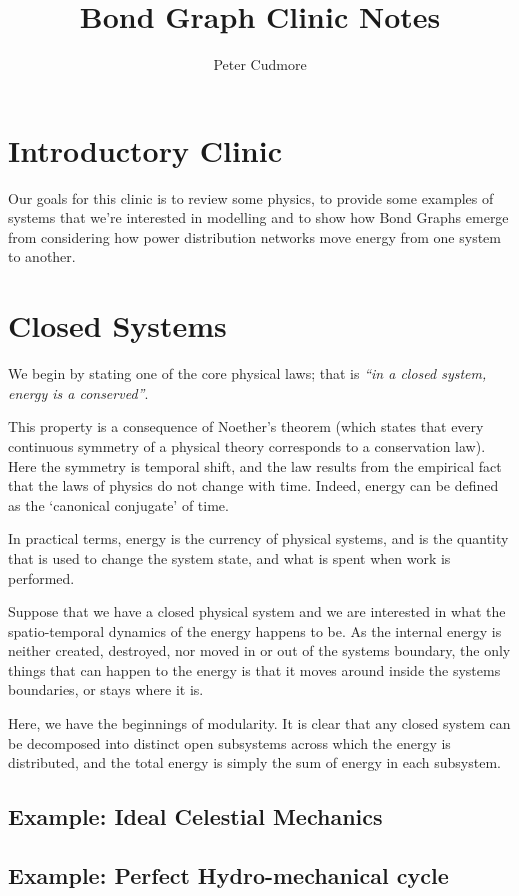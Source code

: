 \documentclass[11pt, a4paper]{amsart}
\title{Bond Graph Clinic Notes}
\author{Peter Cudmore}
\begin{document}
\maketitle

\section{Introductory Clinic}
Our goals for this clinic is to review some physics, to provide some examples of systems that we're interested in modelling and to
show how Bond Graphs emerge from considering how power distribution networks move energy from one system to another.

\section{Closed Systems}
We begin by stating one of the core physical laws; that is \emph{``in a closed system, energy is a conserved''}.

This property is a consequence of Noether's theorem (which states that every continuous symmetry of a physical theory corresponds to a conservation law). Here the symmetry is temporal shift, and the law results from the empirical fact that the laws of physics do not change with time. Indeed, energy can be defined as the `canonical conjugate' of time.

In practical terms, energy is the currency of physical systems, and is the quantity that is used to change the system state, and what is spent when work is performed. 

Suppose that we have a closed physical system and we are interested in what the spatio-temporal dynamics of the energy happens to be.
As the internal energy is neither created, destroyed, nor moved in or out of the systems boundary, the only things that can happen to the energy is that it moves around inside the systems boundaries, or stays where it is.

Here, we have the beginnings of modularity. It is clear that any closed system can be decomposed into distinct open subsystems across which the energy is distributed, and the total energy is simply the sum of energy in each subsystem.

\subsection{Example: Ideal Celestial Mechanics}

\subsection{Example: Perfect Hydro-mechanical cycle}
\end{document}
